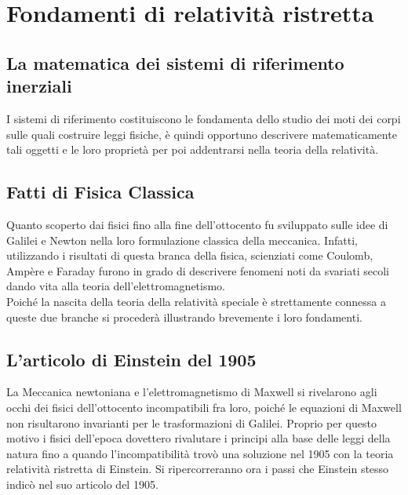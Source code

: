 \documentclass[12pt,a4paper]{book}
\numberwithin{equation}{section}
\begin{document}
\begin{sloppypar}
\frontmatter
\null\newpage

 
\tableofcontents
\mainmatter



\chapter{Fondamenti di relatività ristretta}

\section{La matematica dei sistemi di riferimento inerziali}
\label{sec:MathSDRI}
I sistemi di riferimento costituiscono le fondamenta dello studio dei moti dei corpi sulle quali costruire leggi fisiche, è quindi opportuno descrivere matematicamente tali oggetti e le loro proprietà per poi addentrarsi nella teoria della relatività.



\section{Fatti di Fisica Classica}
Quanto scoperto dai fisici fino alla fine dell'ottocento fu sviluppato sulle idee di Galilei e Newton nella loro formulazione classica della meccanica. Infatti, utilizzando i risultati di questa branca della fisica, scienziati come Coulomb, Ampère e Faraday furono in grado di descrivere fenomeni noti da svariati secoli dando vita alla teoria dell'elettromagnetismo.\\
Poiché la nascita della teoria della relatività speciale è strettamente connessa a queste due branche si procederà illustrando brevemente i loro fondamenti. 





\section{L'articolo di Einstein del 1905}
La Meccanica newtoniana e l'elettromagnetismo di Maxwell si rivelarono agli occhi dei fisici dell'ottocento 
incompatibili fra loro, 
poiché le equazioni di Maxwell non risultarono invarianti per le trasformazioni di Galilei. 
Proprio per questo motivo i fisici dell'epoca dovettero rivalutare i principi alla base delle leggi 
della natura fino a quando l'incompatibilità trovò una soluzione nel 1905 con la teoria relatività ristretta di Einstein.
Si ripercorreranno ora i passi che Einstein stesso indicò nel suo articolo \cite{Einstein1905} del 1905.




\end{sloppypar}
\end{document}
